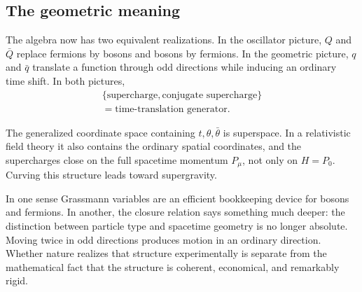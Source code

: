 \begin{classroomqa}
\end{classroomqa}


\subsection{The geometric meaning}

The algebra now has two equivalent realizations. In the oscillator picture, \(Q\) and \(\bar Q\) replace fermions by bosons and bosons by fermions. In the geometric picture, \(q\) and \(\bar q\) translate a function through odd directions while inducing an ordinary time shift. In both pictures,
\begin{equation}
\begin{gathered}
\{\text{supercharge},\text{conjugate supercharge}\}\\
=\text{time-translation generator}.
\end{gathered}
\end{equation}

The generalized coordinate space containing \(t,\theta,\bar\theta\) is superspace. In a relativistic field theory it also contains the ordinary spatial coordinates, and the supercharges close on the full spacetime momentum \(P_\mu\), not only on \(H=P_0\). Curving this structure leads toward supergravity.

In one sense Grassmann variables are an efficient bookkeeping device for bosons and fermions. In another, the closure relation says something much deeper: the distinction between particle type and spacetime geometry is no longer absolute. Moving twice in odd directions produces motion in an ordinary direction. Whether nature realizes that structure experimentally is separate from the mathematical fact that the structure is coherent, economical, and remarkably rigid.
